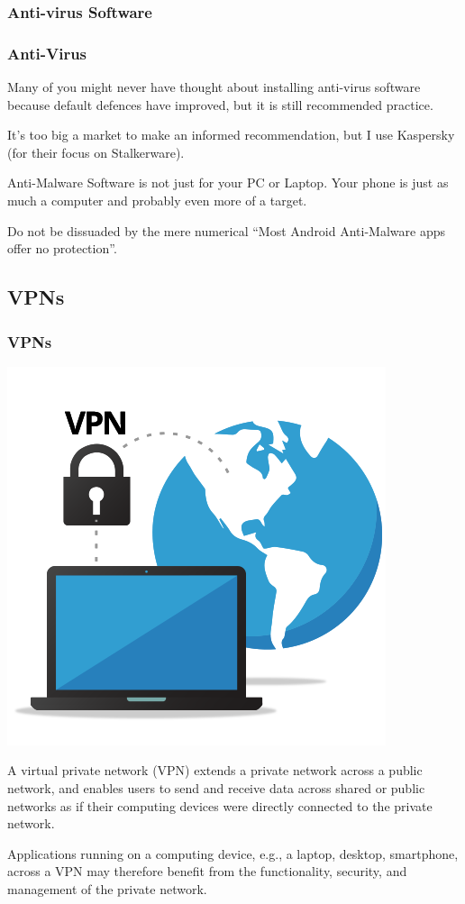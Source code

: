 \documentclass[aspectratio=1610,dvipsnames]{beamer}
\begin{document}
\subsubsection{Anti-virus Software}

\begin{frame}
\frametitle{Anti-Virus}
Many of you might never have thought about installing anti-virus software because default defences have improved, but it is still recommended practice.
\pause\bigskip

It's too big a market to make an informed recommendation, but I use Kaspersky (for their focus on Stalkerware).
\pause\bigskip

Anti-Malware Software is not just for your PC or Laptop. Your phone is just as much a computer and probably even more of a target.
\pause

Do not be dissuaded by the mere numerical ``Most Android Anti-Malware apps offer no protection''.
\end{frame}

\subsection{VPNs}

\begin{frame}
\frametitle{VPNs}

\begin{minipage}{0.5\textwidth}
\begin{center}
\includegraphics[scale=0.4]{images/vpn.png} 
\end{center}
\end{minipage}%
\begin{minipage}{0.5\textwidth}
A virtual private network (VPN) extends a private network across a public network, and enables users to send and receive data across shared or public networks as if their computing devices were directly connected to the private network.
\bigskip

Applications running on a computing device, e.g., a laptop, desktop, smartphone, across a VPN may therefore benefit from the functionality, security, and management of the private network.
\end{minipage}
\end{frame}
\end{document}
